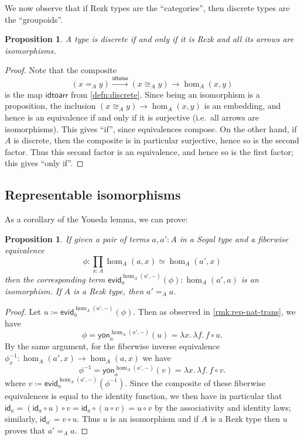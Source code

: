 \documentclass[12pt]{amsart}
\theoremstyle{plain}
\newtheorem{prop}[thm]{Proposition}
\theoremstyle{definition}
\theoremstyle{remark}
\numberwithin{equation}{section}
\newcommand{\defeq}{\coloneqq}
\newcommand{\idtoiso}{\mathsf{idtoiso}}
\newcommand{\idtoarr}{\mathsf{idtoarr}}
\newcommand{\evid}{\mathsf{evid}}
\newcommand{\yon}{\mathsf{yon}}
\newcommand{\lam}[1]{\lambda #1.\,}
\newcommand{\idarr}[1]{\mathsf{id}_{#1}}
\let\xto\xrightarrow
\begin{document}
We now observe that if Rezk types are the ``categories'', then discrete types are the ``groupoids''.

\begin{prop}\label{prop:discrete-are-groupoid}
  A type is discrete if and only if it is Rezk and all its arrows are isomorphisms.
\end{prop}
\begin{proof}
  Note that the composite
  \[ (x=_A y) \xto{\idtoiso} (x\cong_A y) \longrightarrow \hom_A(x,y) \]
  is the map $\idtoarr$ from \cref{defn:discrete}.
  Since being an isomorphism is a proposition, the inclusion $(x\cong_A y) \to \hom_A(x,y)$ is an embedding, and hence is an equivalence if and only if it is surjective (i.e.\ all arrows are isomorphisms).
  This gives ``if'', since equivalences compose.
  On the other hand, if $A$ is discrete, then the composite is in particular surjective, hence so is the second factor. Thus this second factor is an equivalence, and hence so is the first factor; this gives ``only if''.
\end{proof}

\subsection{Representable isomorphisms}

As a corollary of the Yoneda lemma, we can prove:

\begin{prop}\label{prop:rep-iso} If given a pair of terms $a , a' : A$ in a Segal type  and a fiberwise equivalence
\[ \phi:\prod_{x : A} \hom_A(a,x) \simeq \hom_A(a',x)\] then the corresponding term $\evid^{\hom_A(a',-)}_a(\phi) : \hom_A(a',a)$ is an isomorphism. If $A$ is a Rezk type, then $a' =_A a$.
\end{prop}
\begin{proof}
  Let $u \defeq \evid^{\hom_A(a',-)}_a(\phi)$.
  Then as observed in \cref{rmk:rep-nat-trans}, we have
  \[ \phi = \yon^{\hom_A(a',-)}_a(u) = \lam{x} \lam{f} f \circ u. \] %
  By the same argument, for the fiberwise inverse equivalence $\phi_x^{-1}:\hom_A(a',x) \to \hom_A(a,x)$ we have
  \[ \phi^{-1} = \yon^{\hom_A(a',-)}_a(v) = \lam{x} \lam{f} f \circ v. \] %
  where $v \defeq \evid^{\hom_A(a',-)}_a(\phi^{-1})$.
  Since the composite of these fiberwise equivalences is equal to the identity function, we then have in particular that $\idarr a = (\idarr a \circ u) \circ v = \idarr a \circ  (u \circ v) = u \circ v$ by the associativity and identity laws; similarly, $\idarr {a'} = v \circ u$. Thus $u$ is an isomorphism and if $A$ is a Rezk type then $u$ proves that $a' =_A a$.
\end{proof}
\end{document}
